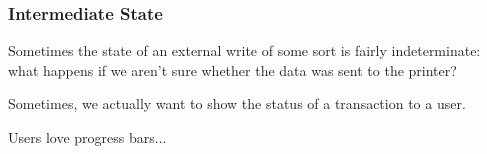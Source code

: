 \begin{frame}
\frametitle{Intermediate State}

Sometimes the state of an external write of some sort is fairly indeterminate: what happens if we aren't sure whether the data was sent to the printer?

Sometimes, we actually want to show the status of a transaction to a user. 


Users love progress bars...

\end{frame}









